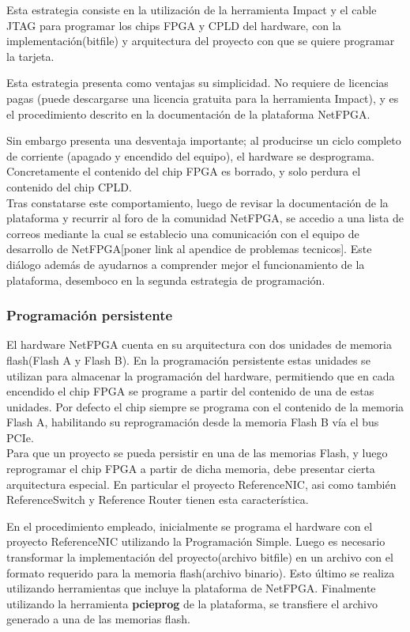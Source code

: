 Esta estrategia consiste en la utilizaci\'on de la herramienta Impact y el cable JTAG para programar los chips FPGA y CPLD del hardware, con la implementaci\'on(bitfile) y arquitectura del proyecto con que se quiere programar la tarjeta.

Esta estrategia presenta como ventajas su simplicidad. No requiere de licencias pagas (puede descargarse una licencia gratuita para la herramienta Impact), y es el procedimiento descrito en la documentaci\'on de la plataforma NetFPGA.

Sin embargo presenta una desventaja importante; al producirse un ciclo completo de corriente (apagado y encendido del equipo), el hardware se desprograma. Concretamente el contenido del chip FPGA es borrado, y solo perdura el contenido del chip CPLD.\\

Tras constatarse este comportamiento, luego de revisar la documentaci\'on de la plataforma y recurrir al foro de la comunidad NetFPGA, se accedio a una lista de correos mediante la cual se establecio una comunicaci\'on con el equipo de desarrollo de NetFPGA[poner link al apendice de problemas tecnicos]. Este di\'alogo adem\'as de ayudarnos a comprender mejor el funcionamiento de la plataforma, desemboco en la segunda estrategia de programaci\'on.

\subsubsection{Programaci\'on persistente}
El hardware NetFPGA cuenta en su arquitectura con dos unidades de memoria flash(Flash A y Flash B). En la programaci\'on persistente estas unidades se utilizan para almacenar la programaci\'on del hardware, permitiendo que en cada encendido el chip FPGA se programe a partir del contenido de una de estas unidades. Por defecto el chip siempre se programa con el contenido de la memoria Flash A, habilitando su reprogramaci\'on desde la memoria Flash B v\'ia el bus PCIe.\\

Para que un proyecto se pueda persistir en una de las memorias Flash, y luego reprogramar el chip FPGA a partir de dicha memoria, debe presentar cierta arquitectura especial. En particular el proyecto ReferenceNIC, asi como tambi\'en ReferenceSwitch y Reference Router tienen esta caracter\'istica.

En el procedimiento empleado, inicialmente se programa el hardware con el proyecto ReferenceNIC utilizando la Programaci\'on Simple. Luego es necesario transformar la implementaci\'on del proyecto(archivo bitfile) en un archivo con el formato requerido para la memoria flash(archivo binario). Esto \'ultimo se realiza utilizando herramientas que incluye la plataforma de NetFPGA. Finalmente utilizando la herramienta \textbf{pcieprog} de la plataforma, se transfiere el archivo generado a una de las memorias flash.\\

